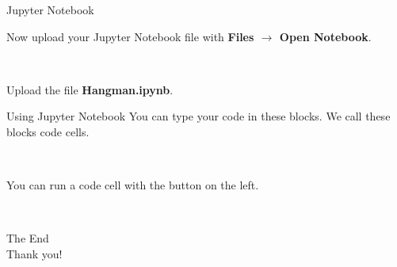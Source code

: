 \documentclass[dvipsnames, svgnames, x11names, handout]{beamer}
\begin{document}
\begin{frame}[fragile]{Jupyter Notebook}
    \begin{center}
        Now upload your Jupyter Notebook file with \textbf{Files $\rightarrow$ Open Notebook}.
    
        \


        Upload the file \textbf{Hangman.ipynb}.
    
    \end{center}
\end{frame}

\begin{frame}[fragile]{Using Jupyter Notebook}
    You can type your code in these blocks. We call these blocks code cells.

    \begin{center}
    \end{center}

    \

    You can run a code cell with the button on the left.

    \begin{center}
    \end{center}
\end{frame}

\begin{frame}{ \ }
	\begin{center}
		The End\\
		Thank you!
	\end{center}
\end{frame}
\end{document}
